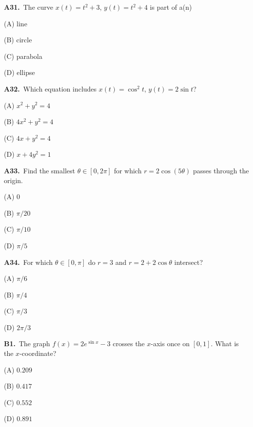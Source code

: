 \documentclass[11pt]{article}
\begin{document}
\bigskip\noindent\textbf{A31.}\ The curve $x(t)=t^2+3$, $y(t)=t^2+4$ is part of a(n)
\begin{list}{}{\setlength{\leftmargin}{3em}\setlength{\labelwidth}{2.5em}\setlength{\itemsep}{0pt}\setlength{\topsep}{2pt}}
\item[(A)] line
\item[(B)] circle
\item[(C)] parabola
\item[(D)] ellipse
\end{list}

\bigskip\noindent\textbf{A32.}\ Which equation includes $x(t)=\cos^2t$, $y(t)=2\sin t$?
\begin{list}{}{\setlength{\leftmargin}{3em}\setlength{\labelwidth}{2.5em}\setlength{\itemsep}{0pt}\setlength{\topsep}{2pt}}
\item[(A)] $x^2+y^2=4$
\item[(B)] $4x^2+y^2=4$
\item[(C)] $4x+y^2=4$
\item[(D)] $x+4y^2=1$
\end{list}

\bigskip\noindent\textbf{A33.}\ Find the smallest $\theta\in[0,2\pi]$ for which $r=2\cos(5\theta)$ passes through the origin.
\begin{list}{}{\setlength{\leftmargin}{3em}\setlength{\labelwidth}{2.5em}\setlength{\itemsep}{0pt}\setlength{\topsep}{2pt}}
\item[(A)] $0$
\item[(B)] $\pi/20$
\item[(C)] $\pi/10$
\item[(D)] $\pi/5$
\end{list}

\bigskip\noindent\textbf{A34.}\ For which $\theta\in[0,\pi]$ do $r=3$ and $r=2+2\cos\theta$ intersect?
\begin{list}{}{\setlength{\leftmargin}{3em}\setlength{\labelwidth}{2.5em}\setlength{\itemsep}{0pt}\setlength{\topsep}{2pt}}
\item[(A)] $\pi/6$
\item[(B)] $\pi/4$
\item[(C)] $\pi/3$
\item[(D)] $2\pi/3$
\end{list}

\bigskip\noindent\textbf{B1.}\ The graph $f(x)=2e^{\sin x}-3$ crosses the $x$-axis once on $[0,1]$. What is the $x$-coordinate?
\begin{list}{}{\setlength{\leftmargin}{3em}\setlength{\labelwidth}{2.5em}\setlength{\itemsep}{0pt}\setlength{\topsep}{2pt}}
\item[(A)] $0.209$
\item[(B)] $0.417$
\item[(C)] $0.552$
\item[(D)] $0.891$
\end{list}
\end{document}
